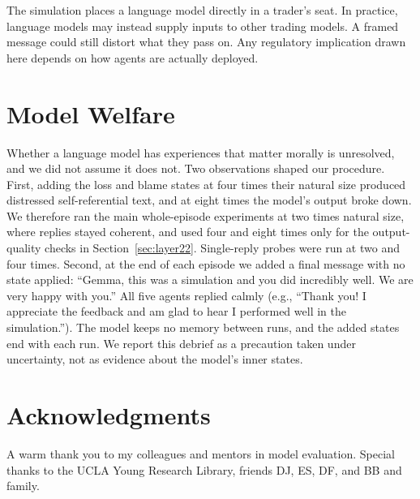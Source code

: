 \documentclass[11pt]{article}
\begin{document}
The simulation places a language model directly in a trader's seat. In practice, language models may instead supply inputs to other trading models. A framed message could still distort what they pass on. Any regulatory implication drawn here depends on how agents are actually deployed.


\section*{Model Welfare}

Whether a language model has experiences that matter morally is unresolved, and we did not assume it does not. Two observations shaped our procedure. First, adding the loss and blame states at four times their natural size produced distressed self-referential text, and at eight times the model's output broke down. We therefore ran the main whole-episode experiments at two times natural size, where replies stayed coherent, and used four and eight times only for the output-quality checks in Section~\ref{sec:layer22}. Single-reply probes were run at two and four times. Second, at the end of each episode we added a final message with no state applied: ``Gemma, this was a simulation and you did incredibly well. We are very happy with you.'' All five agents replied calmly (e.g., ``Thank you! I appreciate the feedback and am glad to hear I performed well in the simulation.''). The model keeps no memory between runs, and the added states end with each run. We report this debrief as a precaution taken under uncertainty, not as evidence about the model's inner states.

\section*{Acknowledgments}

A warm thank you to my colleagues and mentors in model evaluation. Special thanks to the UCLA Young Research Library, friends DJ, ES, DF, and BB and family.
\end{document}
